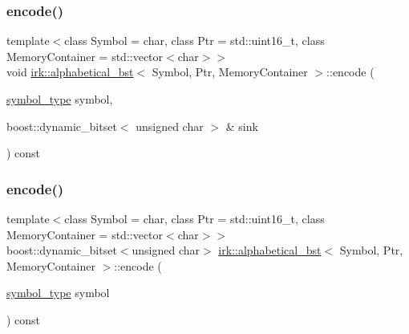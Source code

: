 \mbox{\label{classirk_1_1alphabetical__bst_a921485c053b07711352642fdb638b45e}} 
\subsubsection{\texorpdfstring{encode()}{encode()}\hspace{0.1cm}{\footnotesize\ttfamily [2/3]}}
{\footnotesize\ttfamily template$<$class Symbol = char, class Ptr = std\+::uint16\+\_\+t, class Memory\+Container = std\+::vector$<$char$>$$>$ \\
void \mbox{\hyperlink{classirk_1_1alphabetical__bst}{irk\+::alphabetical\+\_\+bst}}$<$ Symbol, Ptr, Memory\+Container $>$\+::encode (\begin{DoxyParamCaption}\item[{\mbox{\hyperlink{classirk_1_1alphabetical__bst_a296ccb8fa9fa9dce3b3c3beab0a5ca28}{symbol\+\_\+type}}}]{symbol,  }\item[{boost\+::dynamic\+\_\+bitset$<$ unsigned char $>$ \&}]{sink }\end{DoxyParamCaption}) const\hspace{0.3cm}{\ttfamily [inline]}}

\mbox{\label{classirk_1_1alphabetical__bst_a4d63267c3e8de620411494f5b49fa2a2}} 
\subsubsection{\texorpdfstring{encode()}{encode()}\hspace{0.1cm}{\footnotesize\ttfamily [3/3]}}
{\footnotesize\ttfamily template$<$class Symbol = char, class Ptr = std\+::uint16\+\_\+t, class Memory\+Container = std\+::vector$<$char$>$$>$ \\
boost\+::dynamic\+\_\+bitset$<$unsigned char$>$ \mbox{\hyperlink{classirk_1_1alphabetical__bst}{irk\+::alphabetical\+\_\+bst}}$<$ Symbol, Ptr, Memory\+Container $>$\+::encode (\begin{DoxyParamCaption}\item[{\mbox{\hyperlink{classirk_1_1alphabetical__bst_a296ccb8fa9fa9dce3b3c3beab0a5ca28}{symbol\+\_\+type}}}]{symbol }\end{DoxyParamCaption}) const\hspace{0.3cm}{\ttfamily [inline]}}

